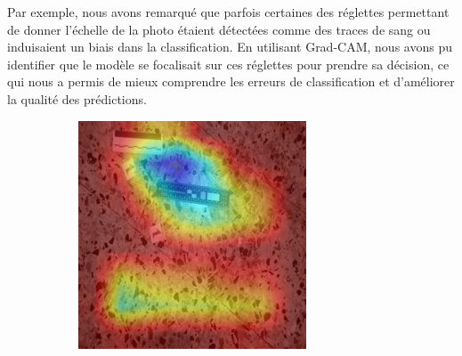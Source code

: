 Par exemple, nous avons remarqué que parfois certaines des réglettes permettant de donner l'échelle de la photo étaient détectées comme des traces de sang ou induisaient un biais dans la classification.
En utilisant Grad-CAM, nous avons pu identifier que le modèle se focalisait sur ces réglettes pour prendre sa décision, ce qui nous a permis de mieux comprendre
les erreurs de classification et d'améliorer la qualité des prédictions.

\begin{figure}
    \centering
    \begin{subfigure}{0.40\linewidth}
        \centering
        \includegraphics[width=\linewidth]{../asset/exemple/attention_reglette.jpg}
    \end{subfigure}
    \begin{subfigure}{0.40\linewidth}
        \centering

\end{subfigure}
\end{figure}
